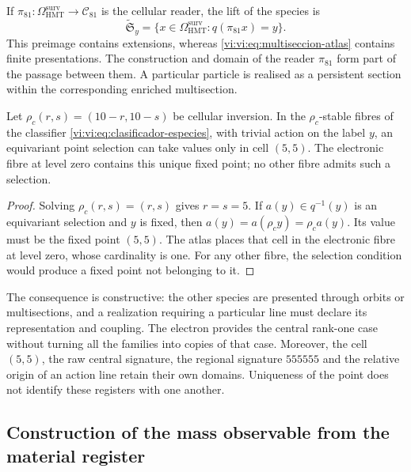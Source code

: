 If $\pi_{81}:\Omega^{\mathrm{surv}}_{\mathrm{HMT}}\to
\mathcal C_{81}$ is the cellular reader, the lift of the species is
\begin{equation}
 \widetilde{\mathfrak S}_y
 =\{x\in\Omega^{\mathrm{surv}}_{\mathrm{HMT}}:
                  q(\pi_{81}x)=y\}.
 \label{vi:vi:eq:multiseccion-enriquecida}
\end{equation}
This preimage contains extensions, whereas
\eqref{vi:vi:eq:multiseccion-atlas} contains finite presentations. The
construction and domain of the reader $\pi_{81}$ form part of the passage
between them. A particular particle is realised as a persistent section
within the corresponding enriched multisection.

\begin{theorem}
\label{vi:vi:thm:selector-central}
Let $\rho_c(r,s)=(10-r,10-s)$ be cellular inversion. In the
$\rho_c$-stable fibres of the classifier \eqref{vi:vi:eq:clasificador-especies},
with trivial action on the label $y$, an equivariant point
selection can take values only in cell $(5,5)$. The electronic fibre
at level zero contains this unique fixed point; no other
fibre admits such a selection.
\end{theorem}
\begin{proof}
Solving $\rho_c(r,s)=(r,s)$ gives $r=s=5$. If $a(y)\in q^{-1}(y)$
is an equivariant selection and $y$ is fixed, then
$a(y)=a(\rho_c y)=\rho_c a(y)$. Its value must be the fixed point
$(5,5)$. The atlas places that cell in the electronic fibre at level
zero, whose cardinality is one. For any other fibre, the selection
condition would produce a fixed point not belonging to it.
\end{proof}

The consequence is constructive: the other species are presented through
orbits or multisections, and a realization requiring a particular
line must declare its representation and coupling. The
electron provides the central rank-one case without turning all
the families into copies of that case. Moreover, the cell $(5,5)$, the raw
central signature, the regional signature $555555$ and the relative origin of an
action line retain their own domains. Uniqueness of the point
does not identify these registers with one another.

\subsection{Construction of the mass observable from the material register}
\label{vi:vi:subsec:particula-observable}

